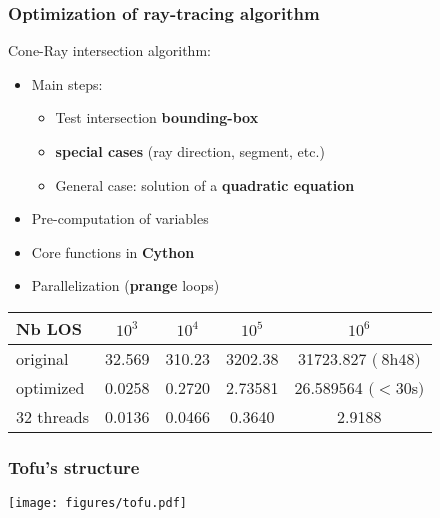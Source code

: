 \documentclass[10pt]{beamer}
\begin{document}
\begin{frame}
\frametitle{Optimization of ray-tracing algorithm}


Cone-Ray intersection algorithm:
	\begin{itemize}
	\item Main steps:
	\begin{itemize}
		\item Test intersection \textbf{bounding-box}
		\item \textbf{special cases} (ray direction, segment, etc.)
		\item General case: solution of a\textbf{ quadratic equation}
	\end{itemize}
	\item Pre-computation of variables
	\item Core functions in \textbf{Cython}
	\item Parallelization (\textbf{prange} loops)
	\end{itemize}
\pause
\begin{table}[h] %
    \centering
    \label{tab:LOS_init_sirrah}
     \begin{tabular}{@{}l*{4}{S[table-format=1.2e-1,scientific-notation=true]}@{}}
       \toprule
       \textbf{Nb LOS} &  {$10^3$} & {$10^4$} & {$10^5$} & {$10^6$}\\
       \midrule
       original       & 32.569 & 310.23 & 3202.38 & 31723.827 $(~8$h$48)$\\
       optimized   & 0.0258 & 0.2720 & 2.73581 & 26.589564 $(<30$s$)$\\
       32 threads & 0.0136 & 0.0466 & 0.3640 & 2.9188 \\
       \bottomrule
     \end{tabular}
\end{table}

	
\end{frame}


\begin{frame}
\frametitle{Tofu's structure}

\begin{center}
    	\texttt{[image: figures/tofu.pdf]}
\end{center}
	
\end{frame}
\end{document}
